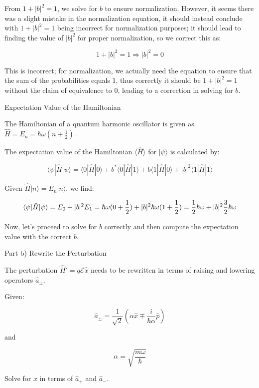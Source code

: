From \( 1 + |b|^2 = 1 \), we solve for \( b \) to ensure normalization. However, it seems there was a slight mistake in the normalization equation, it should instead conclude with \( 1 + |b|^2 = 1 \) being incorrect for normalization purposes; it should lead to finding the value of \( |b|^2 \) for proper normalization, so we correct this as:

\[
1 + |b|^2 = 1 \Rightarrow |b|^2 = 0
\]

This is incorrect; for normalization, we actually need the equation to ensure that the sum of the probabilities equals 1, thus correctly it should be \( 1 + |b|^2 = 1 \) without the claim of equivalence to 0, leading to a correction in solving for \( b \).

Expectation Value of the Hamiltonian

The Hamiltonian of a quantum harmonic oscillator is given as \( \hat{H} = E_n = \hbar\omega(n+\frac{1}{2}) \).

The expectation value of the Hamiltonian \( \langle \hat{H} \rangle \) for \( | \psi \rangle \) is calculated by:

\[
\langle \psi | \hat{H} | \psi \rangle = \langle 0 | \hat{H} | 0 \rangle + b^* \langle 0 | \hat{H} | 1 \rangle + b \langle 1 | \hat{H} | 0 \rangle + |b|^2 \langle 1 | \hat{H} | 1 \rangle
\]

Given \( \hat{H} | n \rangle = E_n | n \rangle \), we find:

\[
\langle \psi | \hat{H} | \psi \rangle = E_0 + |b|^2 E_1 \\
= \hbar\omega(0+\frac{1}{2}) + |b|^2 \hbar\omega(1+\frac{1}{2}) \\
= \frac{1}{2}\hbar\omega + |b|^2 \frac{3}{2}\hbar\omega
\]

Now, let's proceed to solve for \( b \) correctly and then compute the expectation value with the correct \( b \).

Part b) Rewrite the Perturbation

The perturbation \( \hat{H}' = q \mathcal{E} \hat{x} \) needs to be rewritten in terms of raising and lowering operators \( \hat{a}_{\pm} \).

Given:

\[
\hat{a}_{\pm} = \frac{1}{\sqrt{2}}(\alpha \hat{x} \mp \frac{i}{\hbar\alpha} \hat{p})
\]

and

\[
\alpha = \sqrt{\frac{m\omega}{\hbar}}
\]

Solve for \( \hat{x} \) in terms of \( \hat{a}_{+} \) and \( \hat{a}_{-} \).

